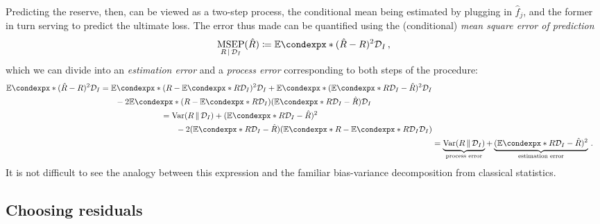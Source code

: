 \documentclass[a4paper]{book}
\theoremstyle{plain}
\newcommand{\condexp}{\mathbb{E}\condexpx}
\begin{document}
Predicting the reserve, then, can be viewed as a two-step process, the conditional mean being estimated by plugging in $\hat{f}_j$, and the former in turn serving to predict the ultimate loss. The error thus made can be quantified using the (conditional) \emph{mean square error of prediction}
\begin{equation} \label{eq:msep}
    \underset{R \, \vert \, \mathcal{D}_I}{\mathrm{MSEP}}(\hat{R}) \coloneqq \condexp*{(\hat{R} - R)^2}{\mathcal{D}_I} \,,
\end{equation}
which we can divide into an \emph{estimation error} and a \emph{process error} corresponding to both steps of the procedure:
\begin{align}
    \begin{split}
        \condexp*{(\hat{R} - R)^2}{\mathcal{D}_I} &= \condexp*{(R - \condexp*{R}{\mathcal{D}_I})^2}{\mathcal{D}_I} + \condexp*{(\condexp*{R}{\mathcal{D}_I} - \hat{R})^2}{\mathcal{D}_I} \\ &\phantom{{}=1} -2\condexp*{(R - \condexp*{R}{\mathcal{D}_I})(\condexp*{R}{\mathcal{D}_I} - \hat{R})}{\mathcal{D}_I}
    \end{split} \\
    \begin{split}
    &= \mathrm{Var}(R \, \Vert \, \mathcal{D}_I) + (\condexp*{R}{\mathcal{D}_I} - \hat{R})^2 \\
    &\phantom{{}=1} -2(\condexp*{R}{\mathcal{D}_I} - \hat{R})(\condexp*{R - \condexp*{R}{\mathcal{D}_I}}{\mathcal{D}_I})
    \end{split} \\
    &= \underbrace{\mathrm{Var}(R \, \Vert \, \mathcal{D}_I)}_\text{process error} + \underbrace{(\condexp*{R}{\mathcal{D}_I} - \hat{R})^2}_\text{estimation error} \,.
\end{align}
It is not difficult to see the analogy between this expression and the familiar bias-variance decomposition from classical statistics.

\subsection{Choosing residuals}
\end{document}
